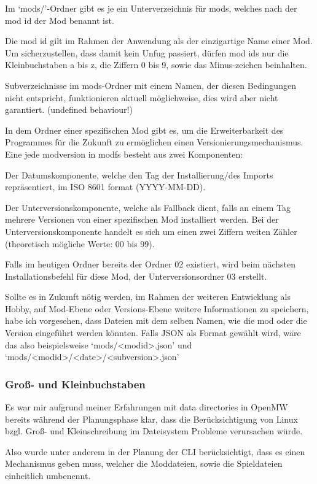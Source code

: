 \documentclass[a4paper,numbers=withenddot,11pt]{scrartcl}
\begin{document}
Im `mods/'-Ordner gibt es je ein Unterverzeichnis für mods, welches nach der mod id
der Mod benannt ist.

Die mod id gilt im Rahmen der Anwendung als der einzigartige Name einer Mod.
Um sicherzustellen, dass damit kein Unfug passiert, dürfen mod ids nur die
Kleinbuchstaben a bis z, die Ziffern 0 bis 9, sowie das Minus-zeichen beinhalten.

Subverzeichnisse im mods-Ordner mit einem Namen, der diesen Bedingungen nicht
entspricht, funktionieren aktuell möglichweise, dies wird aber nicht garantiert.
(undefined behaviour!)

In dem Ordner einer spezifischen Mod gibt es, um die Erweiterbarkeit des Programmes
für die Zukunft zu ermöglichen einen Versionierungsmechanismus.
Eine jede modversion in modfs besteht aus zwei Komponenten:

Der Datumskomponente, welche den Tag der Installierung/des Imports repräsentiert,
im ISO 8601 format (YYYY-MM-DD).

Der Unterversionskomponente, welche als Fallback dient,
falls an einem Tag mehrere Versionen von einer spezifischen Mod installiert werden.
Bei der Unterversionskomponente handelt es sich um einen zwei Ziffern weiten
Zähler (theoretisch mögliche Werte: 00 bis 99).

Falls im heutigen Ordner bereits der Ordner 02 existiert,
wird beim nächsten Installationsbefehl für diese Mod,
der Unterversionsordner 03 erstellt.

Sollte es in Zukunft nötig werden, im Rahmen der weiteren Entwicklung als Hobby,
auf Mod-Ebene oder Versions-Ebene weitere Informationen zu speichern,
habe ich vorgesehen, dass Dateien mit dem selben Namen, wie die mod oder
die Version eingeführt werden könnten. Falls JSON als Format gewählt wird,
wäre das also beispielsweise `mods/<modid>.json' und
`mods/<modid>/<date>/<subversion>.json'

\subsubsection{Groß- und Kleinbuchstaben}

Es war mir aufgrund meiner Erfahrungen mit data directories
in OpenMW bereits während der Planungsphase klar, dass
die Berücksichtigung von Linux bzgl. Groß- und Kleinschreibung
im Dateisystem Probleme verursachen würde.

Also wurde unter anderem in der Planung der CLI berücksichtigt,
dass es einen Mechanismus geben muss, welcher die Moddateien,
sowie die Spieldateien einheitlich umbenennt.
\end{document}
